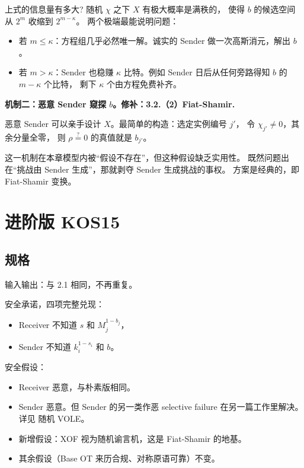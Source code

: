 上式的信息量有多大? 随机 $\chi$ 之下 $X$ 有极大概率是满秩的，
使得 $b$ 的候选空间从 $2^m$ 收缩到 $2^{m-\kappa}$。
两个极端最能说明问题：

\begin{itemize}

\item
  若 $m \le \kappa$：方程组几乎必然唯一解。诚实的 Sender
  做一次高斯消元，解出 $b$。
\item
  若 $m > \kappa$：Sender 也稳赚 $\kappa$ 比特。例如 Sender
  日后从任何旁路得知 $b$ 的 $m - \kappa$ 个比特，
  剩下 $\kappa$ 个由方程免费补齐。
\end{itemize}

\textbf{机制二：恶意 Sender 窥探 $b$。修补：3.2.（2）Fiat-Shamir.}

恶意 Sender 可以亲手设计 $X$。最简单的构造：选定实例编号 $j'$，
令 $\chi_{j'} \ne 0$，其余分量全零，
则 $\rho \stackrel{?}{=} 0$ 的真值就是 $b_{j'}$。

这一机制在本章模型内被“假设不存在”，但这种假设缺乏实用性。
既然问题出在“挑战由 Sender 生成”，那就剥夺 Sender 生成挑战的事权。
方案是经典的，即 Fiat-Shamir 变换。

\section{进阶版 KOS15}
\subsection{规格}

输入输出：与 2.1 相同，不再重复。

安全承诺，四项完整兑现：

\begin{itemize}

\item
  Receiver 不知道 $s$ 和 $M_j^{1-b_j}$，
\item
  Sender 不知道 $k_i^{1-s_i}$ 和 $b$。
\end{itemize}

安全假设：

\begin{itemize}

\item
  Receiver 恶意，与朴素版相同。
\item
  Sender 恶意。但 Sender 的另一类作恶 selective failure
  在另一篇工作里解决。详见 随机 VOLE。
\item
  新增假设：XOF 视为随机谕言机，这是 Fiat-Shamir 的地基。
\item
  其余假设（Base OT 来历合规、对称原语可靠）不变。
\end{itemize}

